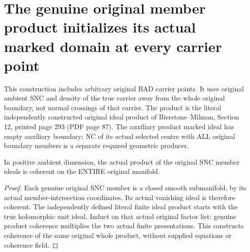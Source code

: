 \section{The genuine original member product initializes its actual marked domain at every carrier point}

This construction includes arbitrary original BAD carrier points. It
uses original ambient SNC and density of the true carrier away from the
whole original boundary, not normal crossings of that carrier. The
product is the literal independently constructed original ideal product
of Bierstone--Milman\cite{bierstone-milman97-invent-math}, Section 12,
printed page 293 (PDF page 87). The auxiliary product marked ideal has
empty auxiliary boundary; NC of its actual selected centre with ALL
original boundary members is a separate required geometric producer.

\begin{lemma}
\label{hir:sharp-original-member-product-coherent-all-points}
\leanok
In positive ambient dimension, the actual product of the original SNC
member ideals is coherent on the ENTIRE original manifold.
\end{lemma}
\begin{proof}
Each genuine original SNC member is a closed smooth submanifold, by its
actual member-intersection coordinates. Its actual vanishing ideal is
therefore coherent. The independently defined literal finite ideal
product starts with the true holomorphic unit ideal. Induct on that
actual original factor list: genuine product coherence multiplies the
two actual finite presentations. This constructs coherence of the same
original whole product, without supplied equations or coherence field.
\end{proof}


